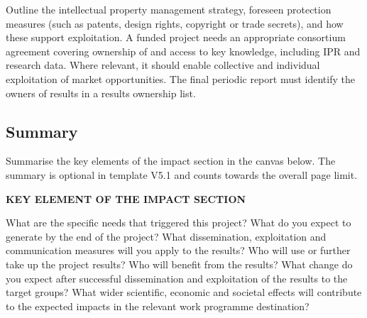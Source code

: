 \begin{heguidance}
Outline the intellectual property management strategy, foreseen protection
measures (such as patents, design rights, copyright or trade secrets), and how
these support exploitation. A funded project needs an appropriate consortium
agreement covering ownership of and access to key knowledge, including IPR and
research data. Where relevant, it should enable collective and individual
exploitation of market opportunities. The final periodic report must identify
the owners of results in a results ownership list.
\end{heguidance}

\ifHEImpactSummary
\begin{HELandscape}
\subsection{Summary}
\label{sec:impact-summary}
\begin{heguidance}
Summarise the key elements of the impact section in the canvas below. The
summary is optional in template V5.1 and counts towards the overall page limit.
\end{heguidance}
\noindent\textbf{KEY ELEMENT OF THE IMPACT SECTION}\par\medskip
\begin{tcbraster}[raster columns=3,raster equal height=rows,
  raster column skip=4mm,raster row skip=4mm]
    {What are the specific needs that triggered this project?}
    {}
    {What do you expect to generate by the end of the project?}
    {}
    {What dissemination, exploitation and communication measures will you
    apply to the results?}
    {}
    {Who will use or further take up the project results? Who will benefit
    from the results?}
    {}
    {What change do you expect after successful dissemination and
    exploitation of the results to the target groups?}
    {}
    {What wider scientific, economic and societal effects will contribute to
    the expected impacts in the relevant work programme destination?}
    {}
\end{tcbraster}
\end{HELandscape}
\fi

